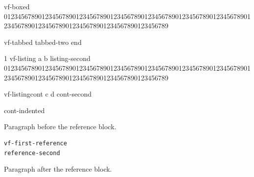 \documentclass{article}
\begin{document}
\begin{boxedverbatim}
vf-boxed
012345678901234567890123456789012345678901234567890123456789012345678901234567890123456789012345678901234567890123456789
\end{boxedverbatim}
\begin{verbatimtab}
vf-tabbed
tabbed-two	end
\end{verbatimtab}
\begin{listing}{1}
vf-listing a  b
listing-second
012345678901234567890123456789012345678901234567890123456789012345678901234567890123456789012345678901234567890123456789
\end{listing}
\begin{listingcont}
vf-listingcont c  d
cont-second

    cont-indented
\end{listingcont}
Paragraph before the reference block.
\begin{verbatim}
vf-first-reference
reference-second
\end{verbatim}
Paragraph after the reference block.
\end{document}
